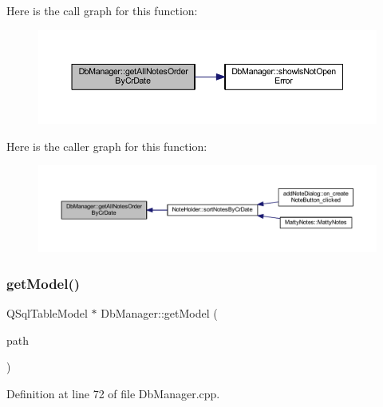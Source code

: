 Here is the call graph for this function\+:
\nopagebreak
\begin{figure}[H]
\begin{center}
\leavevmode
\includegraphics[width=350pt]{classDbManager_a9b35a902ca6a35cd2589a3d1fffda94b_cgraph}
\end{center}
\end{figure}
Here is the caller graph for this function\+:
\nopagebreak
\begin{figure}[H]
\begin{center}
\leavevmode
\includegraphics[width=350pt]{classDbManager_a9b35a902ca6a35cd2589a3d1fffda94b_icgraph}
\end{center}
\end{figure}
\hypertarget{classDbManager_ac4e759380194e624382e267432de5357}{}\label{classDbManager_ac4e759380194e624382e267432de5357} 
\subsubsection{\texorpdfstring{get\+Model()}{getModel()}}
{\footnotesize\ttfamily Q\+Sql\+Table\+Model $\ast$ Db\+Manager\+::get\+Model (\begin{DoxyParamCaption}\item[{const Q\+String \&}]{path }\end{DoxyParamCaption})\hspace{0.3cm}{\ttfamily [static]}}



Definition at line 72 of file Db\+Manager.\+cpp.

